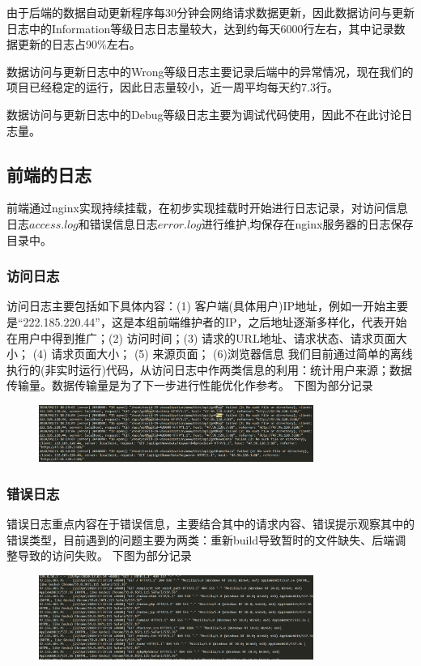\documentclass{article}
\begin{document}
由于后端的数据自动更新程序每30分钟会网络请求数据更新，因此数据访问与更新日志中的Information等级日志日志量较大，达到约每天6000行左右，其中记录数据更新的日志占90\%左右。

数据访问与更新日志中的Wrong等级日志主要记录后端中的异常情况，现在我们的项目已经稳定的运行，因此日志量较小，近一周平均每天约7.3行。

数据访问与更新日志中的Debug等级日志主要为调试代码使用，因此不在此讨论日志量。

\subsection{前端的日志}
前端通过nginx实现持续挂载，在初步实现挂载时开始进行日志记录，对访问信息日志$access.log$和错误信息日志$error.log$进行维护,均保存在nginx服务器的日志保存目录中。
\subsubsection{访问日志}
访问日志主要包括如下具体内容：(1) 客户端(具体用户)IP地址，例如一开始主要是“222.185.220.44”，这是本组前端维护者的IP，之后地址逐渐多样化，代表开始在用户中得到推广；(2) 访问时间；(3) 请求的URL地址、请求状态、请求页面大小； (4) 请求页面大小； (5) 来源页面； (6)浏览器信息
我们目前通过简单的离线执行的(非实时运行)代码，从访问日志中作两类信息的利用：统计用户来源；数据传输量。数据传输量是为了下一步进行性能优化作参考。
下图为部分记录
\begin{figure}[H]
\centering
\includegraphics[width=0.8\textwidth]{access.png}
\end{figure}
\subsubsection{错误日志}
错误日志重点内容在于错误信息，主要结合其中的请求内容、错误提示观察其中的错误类型，目前遇到的问题主要为两类：重新build导致暂时的文件缺失、后端调整导致的访问失败。
下图为部分记录
\begin{figure}[H]
\centering
\includegraphics[width=0.8\textwidth]{error.png}
\end{figure}
\end{document}
